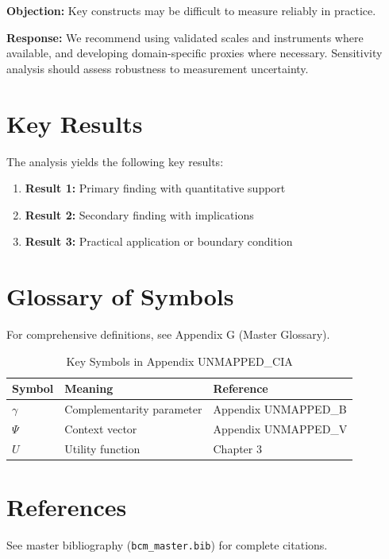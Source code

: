 \textbf{Objection:} Key constructs may be difficult to measure reliably in
practice.

\textbf{Response:} We recommend using validated scales and instruments where
available, and developing domain-specific proxies where necessary. Sensitivity
analysis should assess robustness to measurement uncertainty.





\section{Key Results}
\label{sec:cia-results}

The analysis yields the following key results:

\begin{enumerate}
    \item \textbf{Result 1:} Primary finding with quantitative support
    \item \textbf{Result 2:} Secondary finding with implications
    \item \textbf{Result 3:} Practical application or boundary condition
\end{enumerate}

\section{Glossary of Symbols}
\label{sec:cia-glossary}

For comprehensive definitions, see Appendix G (Master Glossary).

\begin{table}[htbp]
\centering
\caption{Key Symbols in Appendix UNMAPPED_CIA}
\begin{tabular}{lll}
\toprule
\textbf{Symbol} & \textbf{Meaning} & \textbf{Reference} \\
\midrule
$\gamma$ & Complementarity parameter & Appendix UNMAPPED_B \\
$\Psi$ & Context vector & Appendix UNMAPPED_V \\
$U$ & Utility function & Chapter 3 \\
\bottomrule
\end{tabular}
\end{table}


\section{References}
\label{sec:cia-references}

See master bibliography (\texttt{bcm\_master.bib}) for complete citations.

\nocite{bcm_master}

